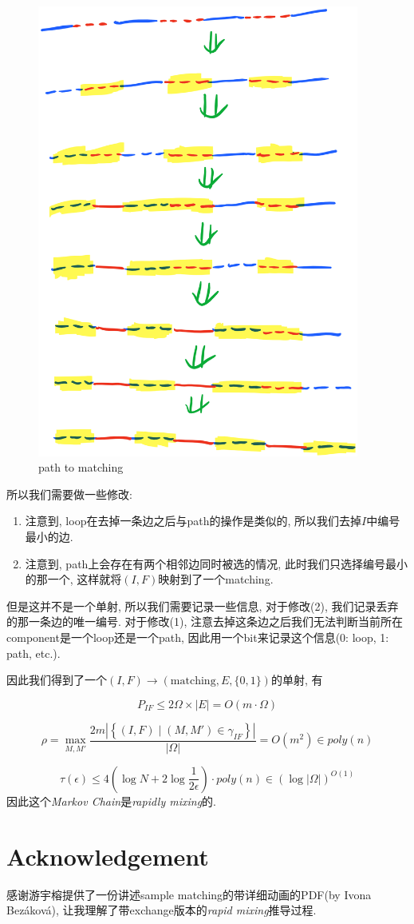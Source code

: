 \documentclass[paper=a4, fontsize=11pt]{scrartcl} %
\numberwithin{figure}{section} %
\numberwithin{table}{section} %
\begin{document}
	\begin{figure}[H]
	\centering
	\includegraphics[width=300pt]{pic5.png}
	\caption*{path to matching}
	\end{figure}

	所以我们需要做一些修改:
	\begin{enumerate}
	 	\item 
	 	注意到, loop在去掉一条边之后与path的操作是类似的, 所以我们去掉$I$中编号最小的边.
	 	\item
		注意到, path上会存在有两个相邻边同时被选的情况, 此时我们只选择编号最小的那一个, 这样就将$(I,F)$映射到了一个matching.
	\end{enumerate} 
	
	但是这并不是一个单射, 所以我们需要记录一些信息, 对于修改(2), 我们记录丢弃的那一条边的唯一编号. 对于修改(1), 注意去掉这条边之后我们无法判断当前所在component是一个loop还是一个path, 因此用一个bit来记录这个信息(0: loop, 1: path, etc.).

	因此我们得到了一个$(I, F)\rightarrow\left(\textrm{matching}, E, \{0, 1\}\right)$的单射, 有

	$$P_{IF} \leq 2\Omega\times |E|= O(m\cdot\Omega)$$

	$$\rho = \max_{M,M'}\frac{2m
		\left| \left\{
		(I,F) \mid (M,M')\in \gamma_{IF}
		\right\} \right|
		}{|\Omega|} = O(m^2) \in \textit{poly}(n) $$

	$$\tau(\epsilon) \leq 4\left(\log N + 2 \log \frac{1}{2 \epsilon}\right)\cdot \textit{poly}(n) \in \left(\log |\Omega|\right)^{O(1)}$$
	因此这个\textit{Markov Chain}是\textit{rapidly mixing}的.

\section*{Acknowledgement}
感谢游宇榕提供了一份讲述sample matching的带详细动画的PDF(by Ivona Bez\'akov\'a), 让我理解了带exchange版本的\textit{rapid mixing}推导过程.
\end{document}
